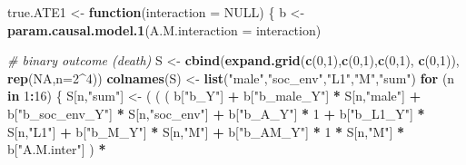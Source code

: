 \documentclass[
]{book}
\newenvironment{Shaded}{\begin{snugshade}}{\end{snugshade}}
\newcommand{\AttributeTok}[1]{\textcolor[rgb]{0.13,0.29,0.53}{#1}}
\newcommand{\CommentTok}[1]{\textcolor[rgb]{0.56,0.35,0.01}{\textit{#1}}}
\newcommand{\ConstantTok}[1]{\textcolor[rgb]{0.56,0.35,0.01}{#1}}
\newcommand{\ControlFlowTok}[1]{\textcolor[rgb]{0.13,0.29,0.53}{\textbf{#1}}}
\newcommand{\DecValTok}[1]{\textcolor[rgb]{0.00,0.00,0.81}{#1}}
\newcommand{\FunctionTok}[1]{\textcolor[rgb]{0.13,0.29,0.53}{\textbf{#1}}}
\newcommand{\NormalTok}[1]{#1}
\newcommand{\OtherTok}[1]{\textcolor[rgb]{0.56,0.35,0.01}{#1}}
\newcommand{\SpecialCharTok}[1]{\textcolor[rgb]{0.81,0.36,0.00}{\textbf{#1}}}
\newcommand{\StringTok}[1]{\textcolor[rgb]{0.31,0.60,0.02}{#1}}
\begin{document}
\begin{Shaded}
\begin{Highlighting}[]
\NormalTok{true.ATE1 }\OtherTok{\textless{}{-}} \ControlFlowTok{function}\NormalTok{(}\AttributeTok{interaction =} \ConstantTok{NULL}\NormalTok{) \{}
\NormalTok{  b }\OtherTok{\textless{}{-}} \FunctionTok{param.causal.model.1}\NormalTok{(}\AttributeTok{A.M.interaction =}\NormalTok{ interaction)}
  
  \CommentTok{\# binary outcome (death)}
\NormalTok{  S }\OtherTok{\textless{}{-}} \FunctionTok{cbind}\NormalTok{(}\FunctionTok{expand.grid}\NormalTok{(}\FunctionTok{c}\NormalTok{(}\DecValTok{0}\NormalTok{,}\DecValTok{1}\NormalTok{),}\FunctionTok{c}\NormalTok{(}\DecValTok{0}\NormalTok{,}\DecValTok{1}\NormalTok{),}\FunctionTok{c}\NormalTok{(}\DecValTok{0}\NormalTok{,}\DecValTok{1}\NormalTok{), }\FunctionTok{c}\NormalTok{(}\DecValTok{0}\NormalTok{,}\DecValTok{1}\NormalTok{)), }\FunctionTok{rep}\NormalTok{(}\ConstantTok{NA}\NormalTok{,}\AttributeTok{n=}\DecValTok{2}\SpecialCharTok{\^{}}\DecValTok{4}\NormalTok{))}
  \FunctionTok{colnames}\NormalTok{(S) }\OtherTok{\textless{}{-}} \FunctionTok{list}\NormalTok{(}\StringTok{"male"}\NormalTok{,}\StringTok{"soc\_env"}\NormalTok{,}\StringTok{"L1"}\NormalTok{,}\StringTok{"M"}\NormalTok{,}\StringTok{"sum"}\NormalTok{)}
  \ControlFlowTok{for}\NormalTok{ (n }\ControlFlowTok{in} \DecValTok{1}\SpecialCharTok{:}\DecValTok{16}\NormalTok{) \{}
\NormalTok{    S[n,}\StringTok{"sum"}\NormalTok{] }\OtherTok{\textless{}{-}}\NormalTok{ ( ( ( b[}\StringTok{"b\_Y"}\NormalTok{] }\SpecialCharTok{+} 
\NormalTok{                      b[}\StringTok{"b\_male\_Y"}\NormalTok{] }\SpecialCharTok{*}\NormalTok{ S[n,}\StringTok{"male"}\NormalTok{] }\SpecialCharTok{+} 
\NormalTok{                      b[}\StringTok{"b\_soc\_env\_Y"}\NormalTok{] }\SpecialCharTok{*}\NormalTok{ S[n,}\StringTok{"soc\_env"}\NormalTok{] }\SpecialCharTok{+} 
\NormalTok{                      b[}\StringTok{"b\_A\_Y"}\NormalTok{] }\SpecialCharTok{*} \DecValTok{1} \SpecialCharTok{+} 
\NormalTok{                      b[}\StringTok{"b\_L1\_Y"}\NormalTok{] }\SpecialCharTok{*}\NormalTok{ S[n,}\StringTok{"L1"}\NormalTok{] }\SpecialCharTok{+}
\NormalTok{                      b[}\StringTok{"b\_M\_Y"}\NormalTok{] }\SpecialCharTok{*}\NormalTok{ S[n,}\StringTok{"M"}\NormalTok{] }\SpecialCharTok{+}
\NormalTok{                      b[}\StringTok{"b\_AM\_Y"}\NormalTok{] }\SpecialCharTok{*} \DecValTok{1} \SpecialCharTok{*}\NormalTok{ S[n,}\StringTok{"M"}\NormalTok{] }\SpecialCharTok{*}\NormalTok{ b[}\StringTok{"A.M.inter"}\NormalTok{] ) }\SpecialCharTok{*}

\end{Highlighting}
\end{Shaded}
\end{document}
